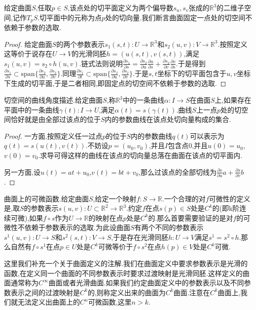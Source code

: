 给定曲面$S$,任取$p\in S$,该点处的切平面定义为两个偏导数$s_u,s_v$张成的$\mathbb{R}^3$的二维子空间,记作$T_pS$.切平面中的元称为点$p$处的切向量.我们断言曲面固定一点处的切空间不依赖于参数的选取.
\begin{proof}
	
	给定曲面$S$的两个参数表示$s_1(s,t):U\to\mathbb{R}^3$和$s_2(u,v):V\to\mathbb{R}^3$.按照定义这等价于说存在$U\to V$的光滑同胚$h=(u(s,t),v(s,t))$,满足$s_1(u,v)=s_2\circ h(u,v)$.链式法则说明$\frac{\partial s_1}{\partial s}=\frac{\partial s_2}{\partial u}\frac{\partial u}{\partial s}+\frac{\partial s_2}{\partial v}\frac{\partial v}{\partial s}$.于是得到$\frac{\partial s_1}{\partial s}\subset\mathrm{span}\{\frac{\partial s_2}{\partial u},\frac{\partial s_2}{\partial v}\}$.同理$\frac{\partial s_1}{\partial t}\subset\mathrm{span}\{\frac{\partial s_2}{\partial u},\frac{\partial s_2}{\partial v}\}$.于是$s,t$坐标下的切平面包含于$u,v$坐标下生成的切平面,于是二者相同,即固定点的切空间不依赖于参数的选取.
\end{proof}

切空间的曲线角度描述.给定曲面$S$,称$\mathbb{R}^3$中的一条曲线$\alpha:I\to S$在曲面$S$上,如果存在平面中的一条曲线$\gamma(t):I\to U$,满足$\alpha(t)=s(\gamma(t))$.曲线$S$上一点$p$处的切空间恰好就是由全部过该点的位于$S$内的参数曲线在该点处切向量构成的集合.
\begin{proof}
	
	一方面,按照定义任一过点$p$的位于$S$内的参数曲线$q(t)$可以表示为$q(t)=s(u(t),v(t))$.不妨设$p=(u_0,v_0)$,并且$I$包含点0,并且$u(0)=u_0$,$v(0)=v_0$.求导可得这样的曲线在该点的切向量总落在曲面在该点的切平面内.
	
	另一方面,设$u(t)=at+u_0$,$v(t)=bt+v_0$,那么过该点的全部切线为$\frac{\partial s}{\partial u}a+\frac{\partial s}{\partial v}b$.
\end{proof}

曲面上的可微函数.给定曲面$S$,给定一个映射$f:S\to\mathbb{R}$.一个合理的对$f$可微性的定义是,取$S$的参数表示$s(u,v):U\subset\mathbb{R}^2\to\mathbb{R}^3$.约定$f$在点$s(p)\in S$处是$C^k$的(即k阶连续可微),如果$f\circ s$作为$U\to\mathbb{R}$的映射在点$p$处是$C^k$的.那么首要需要验证的是对$f$的可微性不依赖于参数表示的选取.为此设曲面$S$有两个不同的参数表示$s^1(u,v):U\to S$和$s^2(s,t):V\to S$,于是存在光滑同胚$h:U\to V$满足$s^1=s^2\circ h$.那么自然有$f\circ s^1$在点$p\in U$处是$C^k$可微等价于$f\circ s^2$在点$h(p)\in V$处是$C^k$可微.

这里我们补充一个关于曲面定义的注解.我们在曲面定义中要求参数表示是光滑的函数,在定义同一个曲面的不同参数表示时要求过渡映射是光滑同胚.这样定义的曲面通常称为$C^{\infty}$曲面或者光滑曲面.如果我们约定曲面定义中的参数表示以及不同参数表示之间的过渡映射是$C^k$的,则称定义出来的曲面为$C^k$曲面.注意在$C^k$曲面上,我们就无法定义出曲面上的$C^n$可微函数,这里$n>k$.

